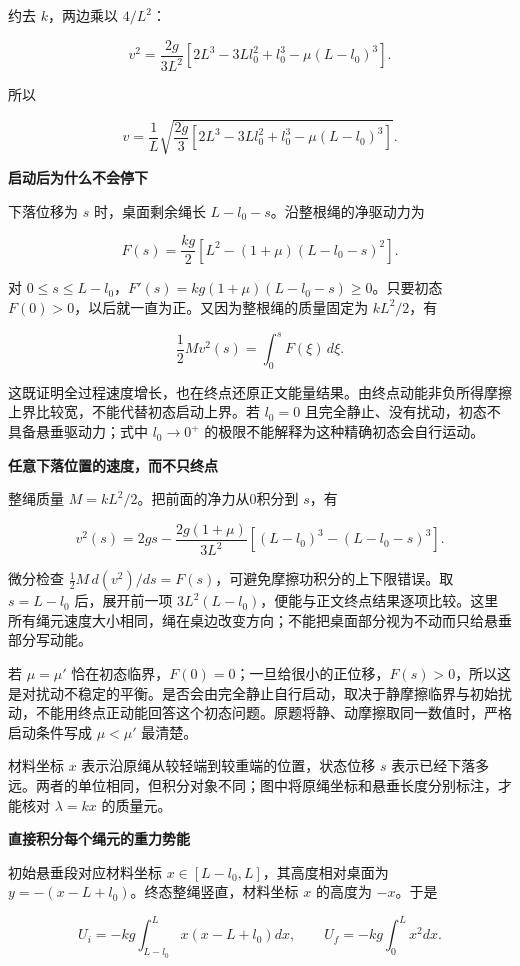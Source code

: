 \documentclass[12pt,a4paper,UTF8]{ctexart}
\begin{document}
约去 \(k\)，两边乘以 \(4/L^2\)：

\[
v^2
=\frac{2g}{3L^2}
\left[
2L^3-3Ll_0^2+l_0^3-\mu(L-l_0)^3
\right].
\]

所以

\[
\boxed{
v=\frac1L
\sqrt{\frac{2g}{3}
\left[
2L^3-3Ll_0^2+l_0^3-\mu(L-l_0)^3
\right]}
}.
\tag{15}
\]

\textbf{启动后为什么不会停下}

下落位移为 \(s\) 时，桌面剩余绳长 \(L-l_0-s\)。沿整根绳的净驱动力为

\[F(s)=\frac{kg}{2}\left[L^2-(1+\mu)(L-l_0-s)^2\right].\]

对 \(0\le s\le L-l_0\)，\(F'(s)=kg(1+\mu)(L-l_0-s)\ge0\)。只要初态
\(F(0)>0\)，以后就一直为正。又因为整根绳的质量固定为 \(kL^2/2\)，有

\[\frac12M v^2(s)=\int_0^sF(\xi)\,d\xi.\]

这既证明全过程速度增长，也在终点还原正文能量结果。由终点动能非负所得摩擦上界比较宽，不能代替初态启动上界。若
\(l_0=0\) 且完全静止、没有扰动，初态不具备悬垂驱动力；式中 \(l_0\to0^+\)
的极限不能解释为这种精确初态会自行运动。

\textbf{任意下落位置的速度，而不只终点}

整绳质量 \(M=kL^2/2\)。把前面的净力从0积分到 \(s\)，有

\[v^2(s)=2gs-\frac{2g(1+\mu)}{3L^2}\left[(L-l_0)^3-(L-l_0-s)^3\right].\]

微分检查 \(\tfrac12M\,d(v^2)/ds=F(s)\)，可避免摩擦功积分的上下限错误。取
\(s=L-l_0\) 后，展开前一项
\(3L^2(L-l_0)\)，便能与正文终点结果逐项比较。这里所有绳元速度大小相同，绳在桌边改变方向；不能把桌面部分视为不动而只给悬垂部分写动能。

若 \(\mu=\mu'\)
恰在初态临界，\(F(0)=0\)；一旦给很小的正位移，\(F(s)>0\)，所以这是对扰动不稳定的平衡。是否会由完全静止自行启动，取决于静摩擦临界与初始扰动，不能用终点正动能回答这个初态问题。原题将静、动摩擦取同一数值时，严格启动条件写成
\(\mu<\mu'\) 最清楚。

材料坐标 \(x\) 表示沿原绳从较轻端到较重端的位置，状态位移 \(s\)
表示已经下落多远。两者的单位相同，但积分对象不同；图中将原绳坐标和悬垂长度分别标注，才能核对
\(\lambda=kx\) 的质量元。

\textbf{直接积分每个绳元的重力势能}

初始悬垂段对应材料坐标 \(x\in[L-l_0,L]\)，其高度相对桌面为
\(y=-(x-L+l_0)\)。终态整绳竖直，材料坐标 \(x\) 的高度为 \(-x\)。于是

\[U_i=-kg\int_{L-l_0}^{L}x(x-L+l_0)dx,\qquad U_f=-kg\int_0^Lx^2dx.\]
\end{document}
